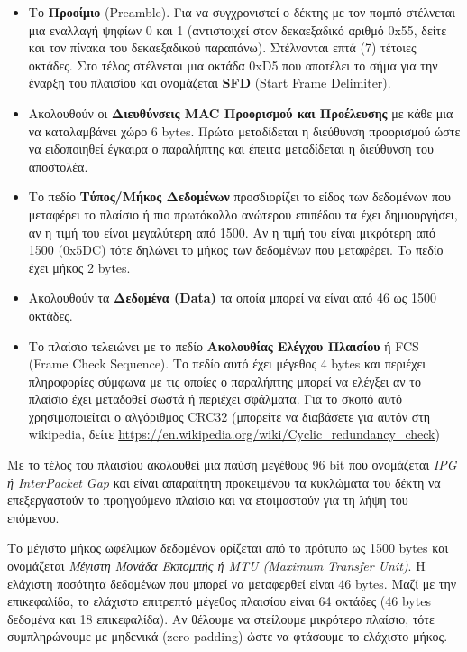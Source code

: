 \begin{itemize}
\item Το \textbf{Προοίμιο} (Preamble). Για να συγχρονιστεί ο δέκτης με τον πομπό στέλνεται μια εναλλαγή ψηφίων 0 και 1 (αντιστοιχεί στον δεκαεξαδικό αριθμό 0x55, δείτε και τον πίνακα του δεκαεξαδικού παραπάνω). Στέλνονται επτά (7) τέτοιες οκτάδες. Στο τέλος στέλνεται μια οκτάδα 0xD5 που αποτέλει το σήμα για την έναρξη του πλαισίου και ονομάζεται \textbf{SFD} (Start Frame Delimiter). 
\item Ακολουθούν οι \textbf{Διευθύνσεις MAC Προορισμού και Προέλευσης} με κάθε μια να καταλαμβάνει χώρο 6 bytes.  Πρώτα μεταδίδεται η διεύθυνση προορισμού ώστε να ειδοποιηθεί έγκαιρα ο παραλήπτης και έπειτα μεταδίδεται η διεύθυνση του αποστολέα. 
\item Το πεδίο \textbf{Τύπος/Μήκος Δεδομένων} προσδιορίζει το είδος των δεδομένων που μεταφέρει το πλαίσιο ή πιο πρωτόκολλο ανώτερου επιπέδου τα έχει δημιουργήσει, αν η τιμή του είναι μεγαλύτερη από 1500. Αν η τιμή του είναι μικρότερη από 1500 (0x5DC) τότε δηλώνει το μήκος των δεδομένων που μεταφέρει. To πεδίο έχει μήκος 2 bytes.
\item Ακολουθούν τα \textbf{Δεδομένα (Data)} τα οποία μπορεί να είναι από 46 ως 1500 οκτάδες.
\item Το πλαίσιο τελειώνει με το πεδίο \textbf{Ακολουθίας Ελέγχου Πλαισίου} ή FCS (Frame Check Sequence). Το πεδίο αυτό έχει μέγεθος 4 bytes και περιέχει πληροφορίες σύμφωνα με τις οποίες ο παραλήπτης μπορεί να ελέγξει αν το πλαίσιο έχει μεταδοθεί σωστά ή περιέχει σφάλματα. Για το σκοπό αυτό χρησιμοποιείται ο  αλγόριθμος CRC32 (μπορείτε να διαβάσετε για αυτόν στη wikipedia, δείτε \url{https://en.wikipedia.org/wiki/Cyclic_redundancy_check})
\end{itemize}

Με το τέλος του πλαισίου ακολουθεί μια παύση μεγέθους 96 bit που ονομάζεται \emph{IPG ή InterPacket Gap} και είναι απαραίτητη προκειμένου τα κυκλώματα του δέκτη να επεξεργαστούν το προηγούμενο πλαίσιο και να ετοιμαστούν για τη λήψη του επόμενου.

Το μέγιστο μήκος ωφέλιμων δεδομένων ορίζεται από το πρότυπο ως 1500 bytes και ονομάζεται \emph{Μέγιστη Μονάδα Εκπομπής ή MTU (Maximum Transfer Unit)}. Η ελάχιστη ποσότητα δεδομένων που μπορεί να μεταφερθεί είναι 46 bytes. Μαζί με την επικεφαλίδα, το ελάχιστο επιτρεπτό μέγεθος πλαισίου είναι 64 οκτάδες (46 bytes δεδομένα και 18 επικεφαλίδα). Αν θέλουμε να στείλουμε μικρότερο πλαίσιο, τότε συμπληρώνουμε με μηδενικά (zero padding) ώστε να φτάσουμε το ελάχιστο μήκος.

